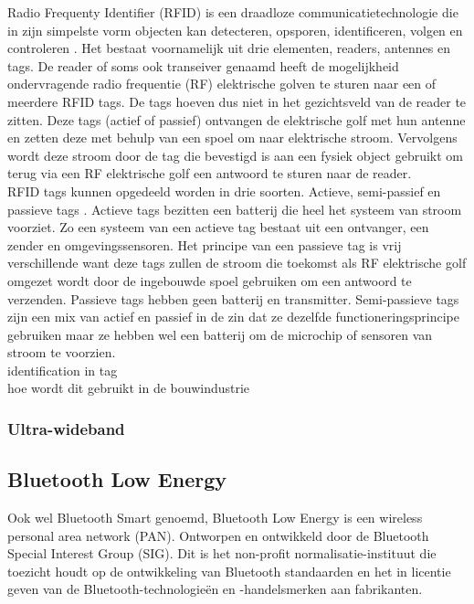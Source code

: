 Radio Frequenty Identifier (RFID)  is een draadloze communicatietechnologie die in zijn simpelste vorm objecten kan detecteren, opsporen, identificeren, volgen en controleren \autocite{Tan2022}. Het bestaat voornamelijk uit drie elementen, readers, antennes en tags. De reader of soms ook transeiver genaamd heeft de mogelijkheid ondervragende radio frequentie (RF) elektrische golven te sturen naar een of meerdere RFID tags. De tags hoeven dus niet in het gezichtsveld van de reader te zitten. Deze tags (actief of passief) ontvangen de elektrische golf met hun antenne en zetten deze met behulp van een spoel om naar elektrische stroom. Vervolgens wordt deze stroom door de tag die bevestigd is aan een fysiek object gebruikt om terug via een RF elektrische golf een antwoord te sturen naar de reader.\\

RFID tags kunnen opgedeeld worden in drie soorten. Actieve, semi-passief en passieve tags \autocite{Mezzanotte2021}.  Actieve tags bezitten een batterij die heel het systeem van stroom voorziet. Zo een systeem van een actieve tag bestaat uit een ontvanger, een zender en omgevingssensoren. Het principe van een passieve tag is vrij verschillende want deze tags zullen de stroom die toekomst als RF elektrische golf omgezet wordt door de ingebouwde spoel gebruiken om een antwoord te verzenden. Passieve tags hebben geen batterij en transmitter. Semi-passieve tags zijn een mix van actief en passief in de zin dat ze dezelfde functioneringsprincipe gebruiken maar ze hebben wel een batterij om de microchip of sensoren van stroom te voorzien.\\

identification in tag
\\
hoe wordt dit gebruikt in de bouwindustrie

\subsubsection{Ultra-wideband}


\subsection{Bluetooth Low Energy}
Ook wel Bluetooth Smart genoemd, Bluetooth Low Energy is een wireless personal area network (PAN). Ontworpen en ontwikkeld door de Bluetooth Special Interest Group (SIG). Dit is het non-profit normalisatie-instituut die toezicht houdt op de ontwikkeling van Bluetooth standaarden en het in licentie geven van de Bluetooth-technologieën en -handelsmerken aan fabrikanten. \\

